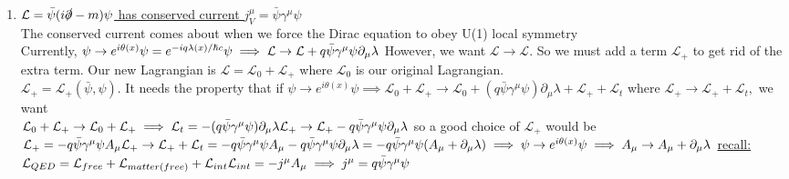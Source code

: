 \documentclass[12pt]{amsart}
\begin{document}
\begin{enumerate}
\item \underline{$\mathcal{L} = \bar{\psi} (i \slashed{\partial} - m ) \psi$ has conserved current $j^{\mu}_{V} = \bar{\psi} \gamma^{\mu} \psi$}\\
The conserved current comes about when we force the Dirac equation to obey U(1) local symmetry\\
Currently, $\psi \rightarrow e^{i \theta(x)} \psi=e^{-iq \lambda(x)/ \hbar c} \psi  \implies \mathcal{L} \rightarrow \mathcal{L} + q \bar{\psi} \gamma^{\mu} \psi \partial_{\mu} \lambda\\$
However, we want $\mathcal{L} \rightarrow \mathcal{L}$. So we must add a term $\mathcal{L}_+$ to get rid of the extra term. Our new Lagrangian is $\mathcal{L}= \mathcal{L}_0 + \mathcal{L}_+$ where $\mathcal{L}_0$ is our original Lagrangian.\\
$\mathcal{L}_+=\mathcal{L}_+(\bar{\psi},\psi)$. It needs the property that if $\psi \rightarrow e^{i \theta(x) } \psi \implies \mathcal{L}_0 + \mathcal{L}_+ \rightarrow \mathcal{L}_0 + ( q \bar{\psi} \gamma^{\mu} \psi) \partial_{\mu} \lambda + \mathcal{L}_+ + \mathcal{L}_t$ where $\mathcal{L}_+ \rightarrow \mathcal{L}_+ + \mathcal{L}_t,$ we want\\
$\mathcal{L}_0 + \mathcal{L}_+ \rightarrow \mathcal{L}_0 + \mathcal{L}_+\\
\implies \mathcal{L}_t = - (q \bar{\psi} \gamma^{\mu} \psi) \partial_{\mu} \lambda\\
\mathcal{L}_+ \rightarrow \mathcal{L}_+ - q \bar{\psi} \gamma^{\mu} \psi \partial_{\mu} \lambda\\$
so a good choice of $\mathcal{L}_+$ would be $\mathcal{L}_+ = - q \bar{\psi} \gamma^{\mu} \psi A_{\mu}\\
\mathcal{L}_+ \rightarrow \mathcal{L}_+ + \mathcal{L}_t = - q \bar{\psi} \gamma^{\mu} \psi A_{\mu} - q \bar{\psi} \gamma^{\mu} \psi \partial_{\mu} \lambda = -q \bar{\psi} \gamma^{\mu} \psi(A_{\mu} + \partial_{\mu} \lambda)\\
\implies \psi \rightarrow e^{i \theta(x)} \psi \implies A_{\mu} \rightarrow A_{\mu} + \partial_{\mu} \lambda\\$
\underline{recall:} $\mathcal{L}_{QED} = \mathcal{L}_{free} + \mathcal{L}_{matter (free)} + \mathcal{L}_{int}\\
\mathcal{L}_{int} = - j^{\mu} A_{\mu} \implies j^{\mu} = q \bar{\psi} \gamma^{\mu} \psi\\$


\hdashrule[0.5ex][c]{\linewidth}{0.5pt}{1.5mm}



\end{enumerate}
\end{document}
